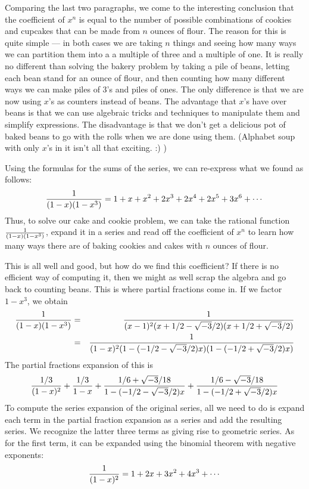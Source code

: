 \documentclass[12pt]{article}
\begin{document}
Comparing the last two paragraphs, we come to the interesting conclusion that the coefficient of $x^n$ is equal to the number of possible combinations of cookies and cupcakes that can be made from $n$ ounces of flour.  The reason for this is quite simple --- in both cases we are taking $n$ things and seeing how many ways we can partition them into a a multiple of three and a multiple of one.  It is really no different than solving the bakery problem by taking a pile of beans, letting each bean stand for an ounce of flour, and then counting how many different ways we can make piles of 3's and piles of ones.  The only difference is that we are now using $x$'s as counters instead of beans.  The advantage that $x$'s have over beans is that we can use algebraic tricks and techniques to manipulate them and simplify expressions.  The disadvantage is that we don't get a delicious pot of baked beans to go with the rolls when we are done using them.  (Alphabet soup with only $x$'s in it isn't all that exciting. :) )

Using the formulas for the sums of the series, we can re-express what we found as follows:
 $${1 \over (1-x)(1-x^3)} = 1 + x + x^2 + 2 x^3 + 2 x^4 + 2 x^5 + 3 x^6 + \cdots$$
Thus, to solve our cake and cookie problem, we can take the rational function ${1 \over (1-x)(1-x^3)}$, expand it in a series and read off the coefficient of $x^n$ to learn how many ways there are of baking cookies and cakes with $n$ ounces of flour.

This is all well and good, but how do we find this coefficient?  If there is no efficient way of computing it, then we might as well scrap the algebra and go back to counting beans.  This is where partial fractions come in.  If we factor $1 - x^3$, we obtain
\begin{eqnarray*}
{1 \over (1-x)(1-x^3)} &=& {1 \over (x-1)^2 (x + 1/2 - \sqrt{-3}/2) (x + 1/2 + \sqrt{-3}/2)} \\
&=& {1 \over (1-x)^2 (1 - (-1/2 - \sqrt{-3}/2) x) (1 - (-1/2 + \sqrt{-3}/2) x)}
\end{eqnarray*}
The partial fractions expansion of this is
 $${1/3 \over (1 - x)^2} + {1/3 \over 1 - x} + {1/6 + \sqrt{-3}/18 \over 1 - (-1/2 - \sqrt{-3}/2) x} + {1/6 - \sqrt{-3}/18 \over 1 - (-1/2 + \sqrt{-3}/2)x}$$
To compute the series expansion of the original series, all we need to do is expand each term in the partial fraction expansion as a series and add the resulting series.  We recognize the latter three terms as giving rise to geometric series.  As for the first term, it can be expanded using the binomial theorem with negative exponents:
 $${1 \over (1-x)^2} = 1 + 2 x + 3 x^2 + 4 x^3 + \cdots$$
\end{document}
